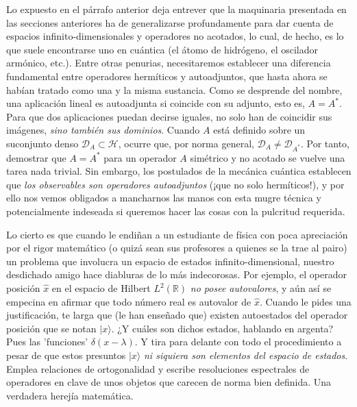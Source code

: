 \documentclass[12pt]{report}
\begin{document}
Lo expuesto en el párrafo anterior deja entrever que la maquinaria presentada en las secciones anteriores ha de generalizarse profundamente para dar cuenta de espacios infinito-dimensionales y operadores no acotados, lo cual, de hecho, es lo que suele encontrarse uno en cuántica (el átomo de hidrógeno, el oscilador armónico, etc.). Entre otras penurias, necesitaremos establecer una diferencia fundamental entre operadores hermíticos y autoadjuntos, que hasta ahora se habían tratado como una y la misma sustancia. Como se desprende del nombre, una aplicación lineal es autoadjunta si coincide con su adjunto, esto es, $A = A^*$. Para que dos aplicaciones puedan decirse iguales, no solo han de coincidir sus imágenes, \textit{sino también sus dominios}. Cuando $A$ está definido sobre un suconjunto denso $\mathcal{D}_A \subset \mathcal{H}$, ocurre que, por norma general, $\mathcal{D}_A \neq \mathcal{D}_{A^*}$. Por tanto, demostrar que $A = A^*$ para un operador $A$ simétrico y no acotado se vuelve una tarea nada trivial. Sin embargo, los postulados de la mecánica cuántica establecen que \textit{los observables son operadores autoadjuntos} (¡que no solo hermíticos!), y por ello nos vemos obligados a mancharnos las manos con esta mugre técnica y potencialmente indeseada si queremos hacer las cosas con la pulcritud requerida. \newline

Lo cierto es que cuando le endiñan a un estudiante de física con poca apreciación por el rigor matemático (o quizá sean sus profesores a quienes se la trae al pairo) un problema que involucra un espacio de estados infinito-dimensional, nuestro desdichado amigo hace diabluras de lo más indecorosas. Por ejemplo, el operador posición $\hat{x}$ en el espacio de Hilbert $L^2(\mathbb{R})$ \textit{no posee autovalores}, y aún así se empecina en afirmar que todo número real es autovalor de $\hat{x}$. Cuando le pides una justificación, te larga que (le han enseñado que) existen autoestados del operador posición que se notan $|x\rangle$. ¿Y cuáles son dichos estados, hablando en argenta? Pues las 'funciones' $\delta(x-\lambda)$. Y tira para delante con todo el procedimiento a pesar de que estos presuntos $|x\rangle$ \textit{ni siquiera son elementos del espacio de estados}. Emplea relaciones de ortogonalidad y escribe resoluciones espectrales de operadores en clave de unos objetos que carecen de norma bien definida. Una verdadera herejía matemática.
\end{document}
